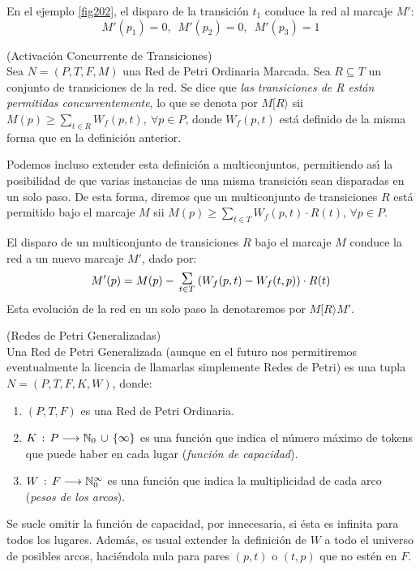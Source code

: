 \begin{example} En el ejemplo \ref{fig202}, el disparo de la transici\'{o}n $t_1$
conduce la red al marcaje $M'$:
\[ M'(p_1) = 0,\,\,\,M'(p_2)=0,\,\,\,M'(p_3)=1 \]
\end{example}

\begin{definition} (Activaci\'{o}n Concurrente de Transiciones)\\
Sea $N= (P,T,F,M)$ una Red de Petri Ordinaria Marcada. Sea
$R \subseteq T$ un conjunto de transiciones de la red.
Se dice que {\it las transiciones de R est\'{a}n permitidas
concurrentemente}, lo que se denota por $M [ R \rangle$
sii $M(p) \geq \sum_{t \in R} W_f(p,t),~
\forall p\in P$, donde
$W_f(p,t)$ est\'{a} definido de la misma forma que en la definici\'{o}n anterior.

Podemos incluso extender esta definici\'{o}n a multiconjuntos,
permitiendo as\'{\i} la posibilidad de que varias instancias de una
misma transici\'{o}n sean disparadas en un solo paso.
De esta forma, diremos que un multiconjunto de transiciones
$R$ est\'{a} permitido bajo el marcaje $M$ sii $M(p)
\geq \sum_{t \in T} W_f(p,t) \cdot R(t)$, $\forall p \in P$.

El disparo de un multiconjunto de transiciones $R$ bajo el
marcaje $M$ conduce la red a un nuevo marcaje $M'$, dado por:
\[ M'(p) = M(p) - \sumas{t \in T} (W_f(p,t) - W_f(t,p)) \cdot R(t)\]
Esta evoluci\'{o}n de la red en un solo paso la denotaremos por
$M[ R \rangle M'$.
\end{definition}

\begin{definition} (Redes de Petri Generalizadas)\\
Una Red de Petri Generalizada (aunque en el futuro nos permitiremos
eventualmente la licencia de llamarlas simplemente Redes de Petri)
es una tupla $N=(P,T,F,K,W)$, donde:
\begin{enumerate}
\item $(P,T,F)$ es una Red de Petri Ordinaria.
\item $K\,:\,P \longrightarrow \mathbb{N}_{0} \,\cup\, \{\infty\}$ es una
funci\'{o}n que indica el n\'{u}mero m\'{a}ximo de tokens que puede haber en
cada lugar ({\it funci\'{o}n de capacidad}).
\item $W\,:\,F \longrightarrow \mathbb{N}_{0}^{\infty}$ es una funci\'{o}n que
indica la multiplicidad de cada arco ({\it pesos de los arcos}).
\end{enumerate}

Se suele omitir la funci\'{o}n de capacidad, por innecesaria,
si \'{e}sta es infinita para todos los lugares. Adem\'{a}s, es
usual extender la definici\'{o}n de $W$ a todo el universo de
posibles arcos, haci\'{e}ndola nula para pares
$(p,t)$ o $(t,p)$ que no est\'{e}n en $F$.
\end{definition}

